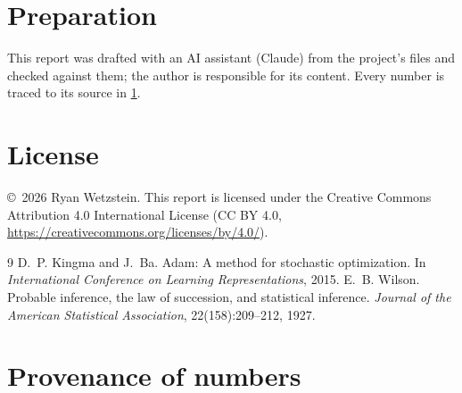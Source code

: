 \documentclass[11pt]{article}
\begin{document}
\section*{Preparation}

This report was drafted with an AI assistant (Claude) from the project's files
and checked against them; the author is responsible for its content. Every
number is traced to its source in \cref{app:provenance}.

\section*{License}

\copyright\ 2026 Ryan Wetzstein. This report is licensed under the Creative
Commons Attribution 4.0 International License (CC BY 4.0,
\url{https://creativecommons.org/licenses/by/4.0/}).

\begin{thebibliography}{9}
 D.~P. Kingma and J.~Ba. Adam: A method for stochastic
  optimization. In \emph{International Conference on Learning Representations}, 2015.
 E.~B. Wilson. Probable inference, the law of succession,
  and statistical inference. \emph{Journal of the American Statistical
  Association}, 22(158):209--212, 1927.
\end{thebibliography}

\appendix
\section{Provenance of numbers}\label{app:provenance}
\end{document}
